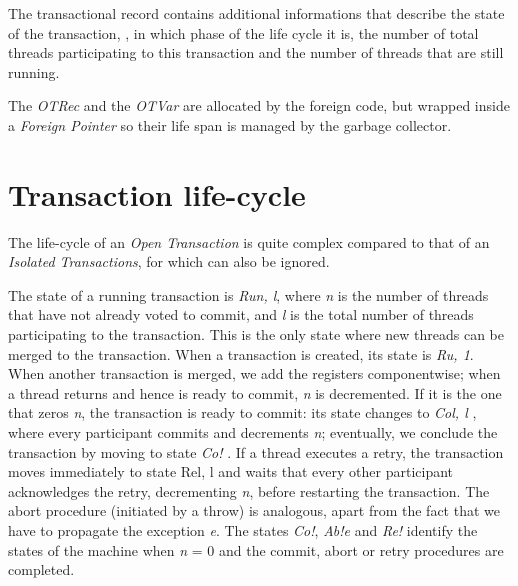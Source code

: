 The transactional record contains additional informations that describe the state of the transaction, \ie, in which phase of the life cycle it is, the number of total threads participating to this transaction and the number of threads that are still running.

The \emph{OTRec} and the \emph{OTVar} are allocated by the foreign code, but wrapped inside a \emph{Foreign Pointer} so their life span is managed by the garbage collector.



\section{Transaction life-cycle}

The life-cycle of an \emph{Open Transaction} is quite complex compared to that of an \emph{Isolated Transactions}, for which can also be ignored.


The state of a running transaction is \emph{Ru\textlangle n, l\textrangle}, where \emph{n} is the number of threads that have not already voted to commit, and \emph{l} is the total number of threads participating to the transaction.
This is the only state where new threads can be merged to the transaction. When a transaction is created, its state is \emph{Ru, 1\textrangle}.
When another transaction is merged, we add the registers componentwise; when a thread returns and hence is ready to commit, \emph{n} is decremented.
If it is the one that zeros \emph{n}, the transaction is ready to commit: its state changes to \emph{Co\textlangle l, l\textrangle} , where every participant commits and decrements \emph{n}; eventually, we conclude the transaction by moving to state \emph{Co!\textlangle \textrangle} .
If a thread executes a retry, the transaction moves immediately to state Re\textlangle l, l\textrangle\xspace and waits that every other participant acknowledges the retry, decrementing \emph{n}, before restarting the transaction.
The abort procedure (initiated by a throw) is analogous, apart from the fact that we have to propagate the exception \emph{e}.
The states \emph{Co!\textlangle \textrangle }, \emph{Ab!\textlangle e\textrangle}  and \emph{Re!\textlangle \textrangle}  identify the states of the machine when \emph{n} = 0 and the commit, abort or retry procedures are completed.

